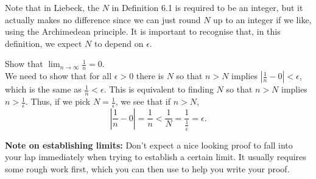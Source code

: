 \documentclass[11pt,dvipsnames]{book}
\numberwithin{figure}{section} %
\numberwithin{table}{section} %
\begin{document}
\medskip
Note that in Liebeck, the $N$ in Definition 6.1 is required to be an integer, but it actually makes no difference since we can just round $N$ up to an integer if we like, using the Archimedean principle. It is important to recognise that, in this definition, we expect $N$ to depend on $\epsilon$.

\newcommand{\floor}[1]{\left\lfloor #1 \right\rfloor}
\newcommand{\ceil}[1]{\left\lceil #1 \right\rceil}


\begin{example}
Show that $\lim_{n\rightarrow \infty} \frac{1}{n}=0$. \\

We need to show that for all $\epsilon>0$ there is $N$ so that $n> N$ implies $|\frac{1}{n}-0|<\epsilon$, which is the same as $\frac{1}{n}<\epsilon$. This is equivalent to finding $N$ so that $n>N$ implies $n>\frac{1}{\epsilon}$. Thus, if we pick $N=\frac{1}{\epsilon}$, we see that if $n> N$,
\[
\left|\frac{1}{n} -0\right|=\frac{1}{n} < \frac{1}{N}= \frac{1}{\frac{1}{\epsilon}}=\epsilon.
\]
\end{example}

\begin{protip}
{\bf Note on establishing limits:} Don't expect a nice looking proof to fall into your lap immediately when trying to establish a certain limit. It usually requires some rough work first, which you can then use to help you write your proof.
\end{protip}
\end{document}
